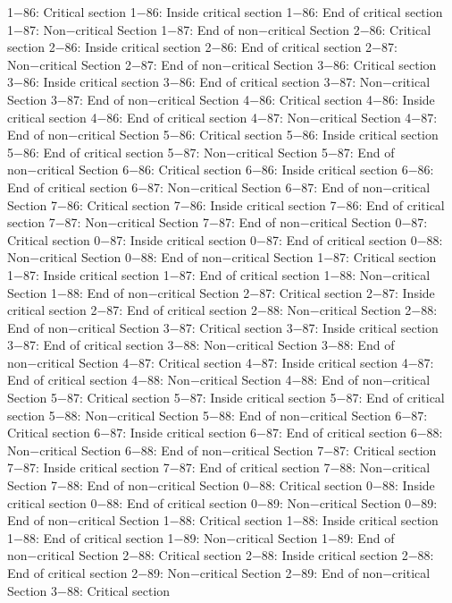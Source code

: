 1−86: Critical section
1−86: Inside critical section
1−86: End of critical section
1−87: Non−critical Section
1−87: End of non−critical Section
2−86: Critical section
2−86: Inside critical section
2−86: End of critical section
2−87: Non−critical Section
2−87: End of non−critical Section
3−86: Critical section
3−86: Inside critical section
3−86: End of critical section
3−87: Non−critical Section
3−87: End of non−critical Section
4−86: Critical section
4−86: Inside critical section
4−86: End of critical section
4−87: Non−critical Section
4−87: End of non−critical Section
5−86: Critical section
5−86: Inside critical section
5−86: End of critical section
5−87: Non−critical Section
5−87: End of non−critical Section
6−86: Critical section
6−86: Inside critical section
6−86: End of critical section
6−87: Non−critical Section
6−87: End of non−critical Section
7−86: Critical section
7−86: Inside critical section
7−86: End of critical section
7−87: Non−critical Section
7−87: End of non−critical Section
0−87: Critical section
0−87: Inside critical section
0−87: End of critical section
0−88: Non−critical Section
0−88: End of non−critical Section
1−87: Critical section
1−87: Inside critical section
1−87: End of critical section
1−88: Non−critical Section
1−88: End of non−critical Section
2−87: Critical section
2−87: Inside critical section
2−87: End of critical section
2−88: Non−critical Section
2−88: End of non−critical Section
3−87: Critical section
3−87: Inside critical section
3−87: End of critical section
3−88: Non−critical Section
3−88: End of non−critical Section
4−87: Critical section
4−87: Inside critical section
4−87: End of critical section
4−88: Non−critical Section
4−88: End of non−critical Section
5−87: Critical section
5−87: Inside critical section
5−87: End of critical section
5−88: Non−critical Section
5−88: End of non−critical Section
6−87: Critical section
6−87: Inside critical section
6−87: End of critical section
6−88: Non−critical Section
6−88: End of non−critical Section
7−87: Critical section
7−87: Inside critical section
7−87: End of critical section
7−88: Non−critical Section
7−88: End of non−critical Section
0−88: Critical section
0−88: Inside critical section
0−88: End of critical section
0−89: Non−critical Section
0−89: End of non−critical Section
1−88: Critical section
1−88: Inside critical section
1−88: End of critical section
1−89: Non−critical Section
1−89: End of non−critical Section
2−88: Critical section
2−88: Inside critical section
2−88: End of critical section
2−89: Non−critical Section
2−89: End of non−critical Section
3−88: Critical section
